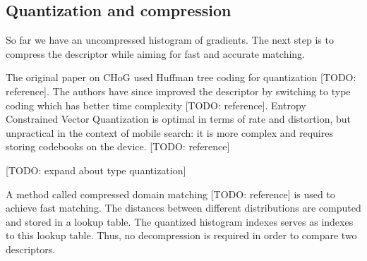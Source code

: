 \subsection{Quantization and compression}

So far we have an uncompressed histogram of gradients. The next step is to compress the descriptor while aiming for fast and accurate matching.

The original paper on CHoG used Huffman tree coding for quantization [TODO: reference]. The authors have since improved the descriptor by switching to type coding which has better time complexity [TODO: reference]. Entropy Constrained Vector Quantization is optimal in terms of rate and distortion, but unpractical in the context of mobile search: it is more complex and requires storing codebooks on the device. [TODO: reference]

[TODO: expand about type quantization]

A method called compressed domain matching [TODO: reference] is used to achieve fast matching. The distances between different distributions are computed and stored in a lookup table. The quantized histogram indexes serves as indexes to this lookup table. Thus, no decompression is required in order to compare two descriptors.

